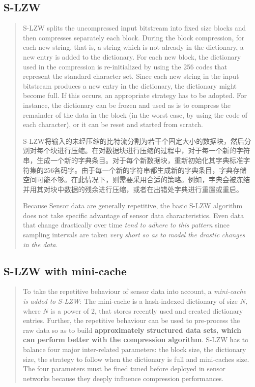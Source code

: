 \subsection{S-LZW}
\begin{quote}
    S-LZW splits the uncompressed input bitstream into fixed size blocks and then compresses separately each block. During the block compression, for each new string, that is, a string which is not already in the dictionary, a new entry is added to the dictionary. For each new block, the dictionary used in the compression is re-initialized by using the 256 codes that represent the standard character set. Since each new string in the input bitstream produces a new entry in the dictionary, the dictionary might become \textcolor[rgb]{0,0,1}{full}. If this occurs, an appropriate strategy has to be adopted. For instance, the dictionary can be frozen and used as is to compress the remainder of the data in the block (in the worst case, by using the code of each character), or it can be reset and started from scratch.

    S-LZW将输入的未经压缩的比特流分割为若干个固定大小的数据块，然后分别对每个块进行压缩。在对数据块进行压缩的过程中，对于每一个新的字符串，生成一个新的字典条目。对于每个新数据块，重新初始化其字典标准字符集的256各码字。由于每一个新的字符串都生成新的字典条目，字典存储空间可能不够。在此情况下，则需要采用合适的策略。例如，字典会被冻结并用其对块中数据的残余进行压缩，或者在出错处字典进行重置或重启。

    Because Sensor data are generally repetitive, the basic S-LZW algorithm does not take specific advantage of sensor data characteristics. Even data that change drastically over time \emph{\textcolor[rgb]{1,0,0}{tend to adhere to this pattern}} since sampling intervals are taken \emph{\textcolor[rgb]{1,0,0}{very short so as to model the drastic changes in the data}}.
\end{quote}

\subsection{S-LZW with mini-cache}
\begin{quote}
    To take the repetitive behaviour of sensor data into account, a \emph{\textcolor[rgb]{1,0,0}{mini-cache is added to S-LZW}}: The mini-cache is a \textcolor[rgb]{1,0,0}{hash-indexed dictionary of size $N$}, where $N$ is a power of 2, that stores recently used and created dictionary entries. Further, the repetitive behaviour can be used to \textcolor[rgb]{1,0,0}{pre-process} the raw data so as to build \textbf{\textcolor[rgb]{1,0,0}{approximately structured data sets, which can perform better with the compression algorithm}}\cite{Sadler2006}. S-LZW has to balance four major inter-related parameters: \textcolor[rgb]{1,0,0}{the block size}, \textcolor[rgb]{1,0,0}{the dictionary size}, \textcolor[rgb]{1,0,0}{the strategy to follow when the dictionary is full} and \textcolor[rgb]{1,0,0}{mini-caches size}. The four parameters must be fined tuned before deployed in sensor networks because they deeply influence compression performances.
\end{quote}

